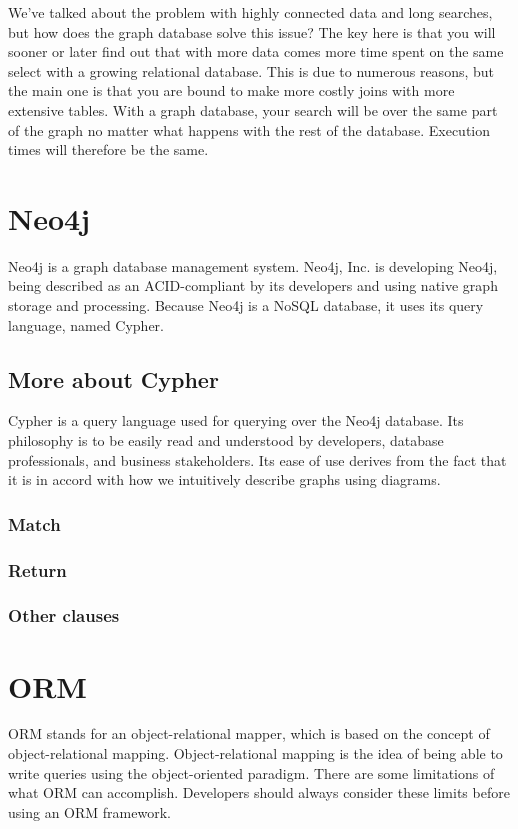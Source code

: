 \documentclass[thesis=M,english]{FITthesis}[2019/12/23]
\begin{document}
We've talked about the problem with highly connected data and long searches, but how does the graph database solve this issue? The key here is that you will sooner or later find out that with more data comes more time spent on the same select with a growing relational database. This is due to numerous reasons, but the main one is that you are bound to make more costly joins with more extensive tables. With a graph database, your search will be over the same part of the graph no matter what happens with the rest of the database. Execution times will therefore be the same.


\section{Neo4j}

Neo4j is a graph database management system. Neo4j, Inc. is developing Neo4j, being described as an ACID-compliant by its developers and using native graph storage and processing. Because Neo4j is a NoSQL database, it uses its query language, named Cypher.

\subsection{More about Cypher}

Cypher is a query language used for querying over the Neo4j database. Its philosophy is to be easily read and understood by developers, database professionals, and business stakeholders.  Its ease of use derives from the fact that it is in accord with how we intuitively describe graphs using diagrams. \cite{robinson_graph_2015}

\subsubsection{Match}
\subsubsection{Return}
\subsubsection{Other clauses}

\section{ORM}
ORM stands for an object-relational mapper, which is based on the concept of object-relational mapping. Object-relational mapping is the idea of being able to write queries using the object-oriented paradigm. 
There are some limitations of what ORM can accomplish. Developers should always consider these limits before using an ORM framework. \cite{mario_hoyos_what_2018}
\end{document}
